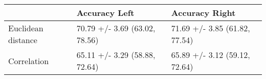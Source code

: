 \begin{tabular}{lll}
\toprule
{} &                  Accuracy Left &                 Accuracy Right \\
\midrule
Euclidean distance &  70.79 +/- 3.69 (63.02, 78.56) &  71.69 +/- 3.85 (61.82, 77.54) \\
Correlation        &  65.11 +/- 3.29 (58.88, 72.64) &  65.89 +/- 3.12 (59.12, 72.64) \\
\bottomrule
\end{tabular}
